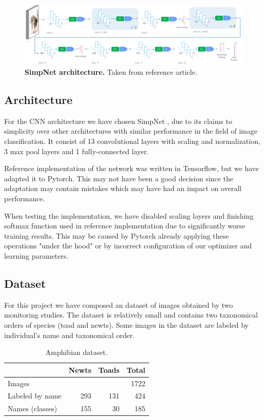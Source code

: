 \documentclass[fleqn,moreauthors,10pt]{ds_report}
\begin{document}
\begin{figure}[htb]\centering
	\includegraphics[width=\linewidth]{simpnet-arch.png}
	\caption{\textbf{SimpNet architecture.} Taken from reference article.}
	\label{fig:simpet-arch}
\end{figure}

\subsection*{Architecture}

For the CNN architecture we have chosen SimpNet \cite{simpnet}, due to its claims to simplicity over other architectures with similar performance in the field of image classification. It consist of 13 convolutional layers with scaling and normalization, 3 max pool layers and 1 fully-connected layer.

Reference implementation of the network was written in Tensorflow, but we have adapted it to Pytorch. This may not have been a good decision since the adaptation may contain mistakes which may have had an impact on overall performance.

When testing the implementation, we have disabled scaling layers and finishing softmax function used in reference implementation due to significantly worse training results. This may be caused by Pytorch already applying these operations "under the hood" or by incorrect configuration of our optimizer and learning parameters.

\subsection*{Dataset}

For this project we have composed an dataset of images obtained by two monitoring studies. The dataset is relatively small and contains two taxonomical orders of species (toad and newts). Some images in the dataset are labeled by individual's name and taxonomical order.

\begin{table}[hbt]
	\caption{Amphibian dataset.}
	\centering
	\begin{tabular}{l | r r r}
		\toprule
		                  & Newts  & Toads    & Total \\
		\midrule
		Images            &        &          & 1722  \\
		Labeled by name   & 293    & 131      & 424   \\
		Names (classes)   & 155    & 30       & 185   \\
		\bottomrule
	\end{tabular}
	\label{tab:amphibian-dataset}
\end{table}
\end{document}
